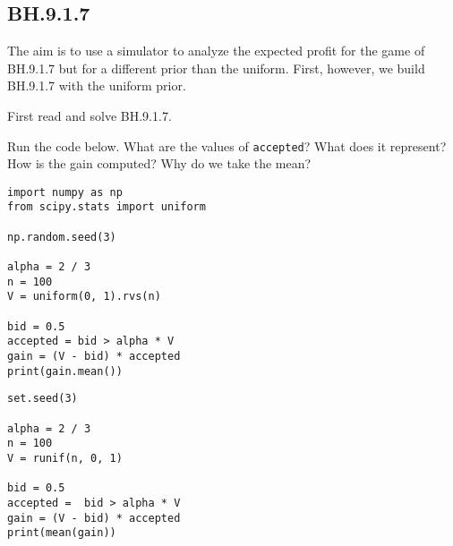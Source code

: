 \subsection{BH.9.1.7}
\label{sec:bh.9.1.7}

The aim is to use a simulator to analyze the expected profit for the game of BH.9.1.7 but for a different prior than the uniform.
First, however, we build BH.9.1.7 with the uniform prior.

First read and solve BH.9.1.7.

\begin{exercise}
Run the code below. What are the values of \verb|accepted|? What does it represent? How is the gain computed? Why do we take the mean?
\begin{verbatim}
import numpy as np
from scipy.stats import uniform

np.random.seed(3)

alpha = 2 / 3
n = 100
V = uniform(0, 1).rvs(n)

bid = 0.5
accepted = bid > alpha * V
gain = (V - bid) * accepted
print(gain.mean())
\end{verbatim}

\begin{verbatim}
set.seed(3)

alpha = 2 / 3
n = 100
V = runif(n, 0, 1)

bid = 0.5
accepted =  bid > alpha * V
gain = (V - bid) * accepted
print(mean(gain))
\end{verbatim}
\end{exercise}


